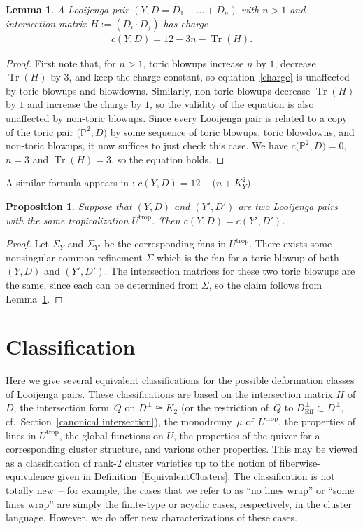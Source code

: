 \documentclass[pdftex]{sigma}
\numberwithin{equation}{section}
\numberwithin{figure}{section}
\numberwithin{table}{section}
\DeclareMathOperator{\Tr}{Tr}
\DeclareMathOperator{\trop}{trop}
\DeclareMathOperator{\Eff}{Eff}
\let\bb=\mathbb
\newtheorem{lem}[thm]{Lemma}
\newtheorem{prop}[thm]{Proposition}
\theoremstyle{definition}
\begin{document}
\begin{lem} \label{ch}A Looijenga pair $(Y,D=D_1+\dots+D_n)$ with $n>1$ and intersection matrix $H:= (D_i\cdot D_j )$ has charge
\begin{gather}\label{charge}
	c(Y,D)=12-3n-\Tr(H).
\end{gather}
\end{lem}

\begin{proof}First note that, for $n>1$, toric blowups increase $n$ by $1$, decrease $\Tr(H)$ by $3$, and keep the charge constant, so equation~\eqref{charge} is unaffected by toric blowups and blowdowns. Similarly, non-toric blowups decrease $\Tr(H)$ by $1$ and increase the charge by $1$, so the validity of the equation is also unaffected by non-toric blowups. Since every Looijenga pair is related to a copy of the toric pair $\big(\bb{P}^2,D\big)$ by some sequence of toric blowups, toric blowdowns, and non-toric blowups, it now suffices to just check this case. We have $c\big(\bb{P}^2,D\big)=0$, $n=3$ and $\Tr(H)=3$, so the equation holds.
\end{proof}

A similar formula appears in \cite{GHK2}: $c(Y,D)=12-\big(n+K_Y^2\big)$.

\begin{prop}\label{TropCharge}Suppose that $(Y,D)$ and $(Y',D')$ are two Looijenga pairs with the same tropicalization $U^{\trop}$. Then $c(Y,D)=c(Y',D')$.
\end{prop}

\begin{proof}Let $\Sigma_Y$ and $\Sigma_{Y'}$ be the corresponding fans in $U^{\trop}$. There exists some nonsingular common refinement $\Sigma$ which is the fan for a toric blowup of both $(Y,D)$ and $(Y',D')$. The intersection matrices for these two toric blowups are the same, since each can be determined from $\Sigma$, so the claim follows from Lemma~\ref{ch}.
\end{proof}

\section{Classification}\label{classification}

Here we give several equivalent classifications for the possible deformation classes of Looijenga pairs. These classifications are based on the intersection matrix $H$ of $D$, the intersection form~$Q$ on $D^{\perp}\cong K_2$ (or the restriction of~$Q$ to $D^{\perp}_{\Eff} \subset D^{\perp}$, cf.\ Section~\ref{canonical intersection}), the monodromy~$\mu$ of~$U^{\trop}$, the properties of lines in $U^{\trop}$, the global functions on $U$, the properties of the quiver for a corresponding cluster structure, and various other properties. This may be viewed as a classification of rank-$2$ cluster varieties up to the notion of fiberwise-equivalence given in Definition~\ref{EquivalentClusters}. The classification is not totally new~-- for example, the cases that we refer to as ``no lines wrap'' or ``some lines wrap'' are simply the finite-type or acyclic cases, respectively, in the cluster language. However, we do offer new characterizations of these cases.
\end{document}
